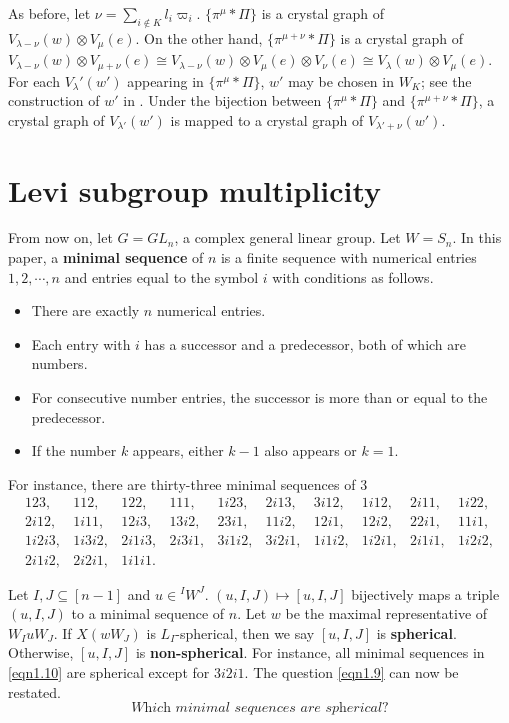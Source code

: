 \documentclass[12pt]{amsart}
\theoremstyle{definition}
\theoremstyle{remark}
\begin{document}
As before, let $\nu = \sum_{i \notin K} l_i \varpi_i$. $\{ \pi^\mu * \Pi \}$ is a crystal graph of $V_{\lambda - \nu}(w) \otimes V_\mu (e)$. On the other hand, $\{ \pi^{\mu+ \nu} * \Pi \}$ is a crystal graph of $V_{\lambda - \nu}(w) \otimes V_{\mu + \nu} (e) \cong V_{\lambda- \nu} (w) \otimes V_\mu (e) \otimes V_\nu (e) \cong V_\lambda(w) \otimes V_\mu (e)$. For each $V_\lambda' (w')$ appearing in $\{ \pi^\mu * \Pi \}$, $w'$ may be chosen in $W_K$; see the construction of $w'$ in \cite[Proposition 12]{MR1887117}. Under the bijection between $\{ \pi^\mu * \Pi \}$ and $\{ \pi^{\mu + \nu} * \Pi \}$, a crystal graph of $V_{\lambda'}(w')$ is mapped to a crystal graph of $V_{\lambda' + \nu} (w')$. 



\section{Levi subgroup multiplicity}\label{sec4} 

From now on, let $G = GL_n$, a complex general linear group. Let $W= S_n$. In this paper, a \textbf{minimal sequence} of $n$ is a finite sequence with numerical entries $1,2, \cdots , n$ and entries equal to the symbol $i$ with conditions as follows.
\begin{itemize}
\item There are exactly $n$ numerical entries.
\item Each entry with $i$ has a successor and a predecessor, both of which are numbers.
\item For consecutive number entries, the successor is more than or equal to the predecessor.
\item If the number $k$ appears, either $k-1$ also appears or $k=1$.
\end{itemize}
For instance, there are thirty-three minimal sequences of $3$
\begin{equation}\label{eqn1.10}
\begin{matrix}
123, & 112, & 122, & 111, & 1i23, & 2i13, & 3i12, & 1i12, & 2i11, & 1i22, \\
2i12, & 1i11, & 12i3, & 13i2, & 23i1, & 11i2, & 12i1, & 12i2, & 22i1, & 11i1, \\
1i2i3, & 1i3i2, & 2i1i3, & 2i3i1, & 3i1i2, & 3i2i1, & 1i1i2, & 1i2i1, & 2i1i1, & 1i2i2, \\
2i1i2, & 2i2i1, & 1i1i1.
\end{matrix}
\end{equation}

Let $I , J \subseteq [n-1]$ and $u \in {}^I W^J$. $(u,I,J) \mapsto [u,I,J]$ bijectively maps a triple $(u,I,J)$ to a minimal sequence of $n$. Let $w$ be the maximal representative of $W_I u W_J$. If $X(wW_J)$ is $L_I$-spherical, then we say $[u,I,J]$ is \textbf{spherical}. Otherwise, $[u,I,J]$ is \textbf{non-spherical}. For instance, all minimal sequences in \eqref{eqn1.10} are spherical except for $3i2i1$. The question \eqref{eqn1.9} can now be restated.
\begin{equation}\label{eqn1.11}
\textit{Which minimal sequences are spherical?}
\end{equation}
\end{document}
